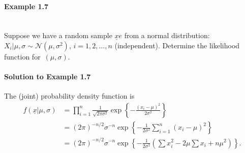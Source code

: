 \paragraph{Example 1.7}{~\\
Suppose we have a random sample $\underline{x}e$ from a normal distribution: $X_i|\mu,\sigma\sim \mathcal{N}(\mu,\sigma^2)$, $i=1,2,\ldots,n$ (independent). Determine the likelihood function for~$(\mu,\sigma)$.

\paragraph{Solution to Example 1.7}{
    
        The (joint) probability density function is
        \begin{align*}
        f(\underline{x}|\mu,\sigma)
        &=\prod_{i=1}^n \frac{1}{\sqrt{2\pi\sigma^2}}
        \exp\left\{-\frac{(x_i-\mu)^2}{2\sigma^2}\right\} \\
        &=(2\pi)^{-n/2}\sigma^{-n}
        \exp\left\{-\frac{1}{2\sigma^2}\sum_{i=1}^n (x_i-\mu)^2\right\} \\
        &=(2\pi)^{-n/2}\sigma^{-n}
        \exp\left\{-\frac{1}{2\sigma^2}
        \left(\sum x_i^2-2\mu\sum x_i+n\mu^2\right)\right\}.
        \end{align*}
    
}}
























































